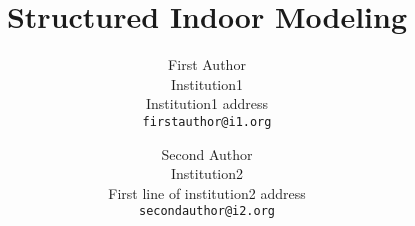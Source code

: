 \documentclass[10pt,twocolumn,letterpaper]{article}
\begin{document}
	
\title{Structured Indoor Modeling}
	
\author{First Author\\
	Institution1\\
	Institution1 address\\
	{\tt\small firstauthor@i1.org}
	\and
	Second Author\\
	Institution2\\
	First line of institution2 address\\
{\tt\small secondauthor@i2.org}
}
	
\maketitle
	
\end{document}
